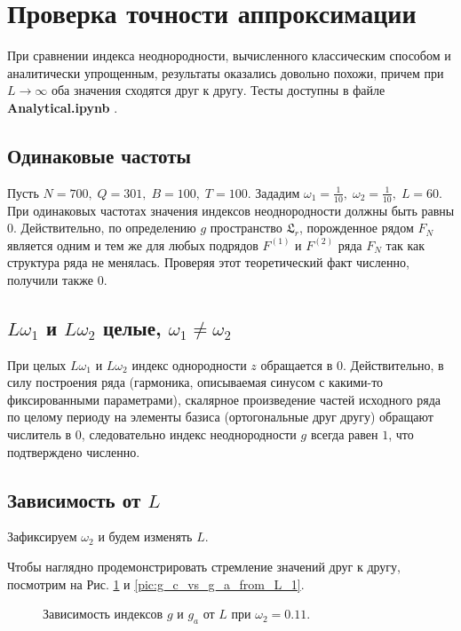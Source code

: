 \documentclass[specialist, substylefile = spbu.rtx,
			   subf, href, 12pt]{disser}
\begin{document}
\section{Проверка точности аппроксимации}
При сравнении индекса неоднородности, вычисленного классическим способом и аналитически упрощенным, результаты оказались довольно похожи, причем при $L \rightarrow \infty $ оба значения сходятся друг к другу. Тесты доступны в файле \textbf{Analytical.ipynb} \cite{Kononykhin2022}.



\subsection{Одинаковые частоты}
Пусть $ N = 700,\; Q = 301,\; B = 100,\; T = 100 $. 
Зададим $\omega_1 = \frac{1}{10},\; \omega_2 = \frac{1}{10},\; L = 60$. При одинаковых частотах значения индексов неоднородности должны быть равны $ 0 $. Действительно, по определению $ g $ пространство $ \mathfrak{L}_r $, порожденное рядом $ F_N $ является одним и тем же для любых подрядов $ F^{(1)} $ и $ F^{(2)} $ ряда $ F_N $ так как структура ряда не менялась.
Проверяя этот теоретический факт численно, получили также $ 0 $.

\subsection{$L\omega_1$ и $L\omega_2 $ целые, $\omega_1 \neq \omega_2 $}
При целых $L\omega_1$ и $L\omega_2 $ индекс однородности $ z $ обращается в 0. Действительно, в силу построения ряда (гармоника, описываемая синусом с какими-то фиксированными параметрами), скалярное произведение частей исходного ряда по целому периоду на элементы базиса (ортогональные друг другу) обращают числитель в 0, следовательно индекс неоднородности $ g $ всегда равен $ 1 $, что подтверждено численно.


\subsection{Зависимость от $ L $}

Зафиксируем $ \omega_2 $ и будем изменять $ L $. 

Чтобы наглядно продемонстрировать стремление значений друг к другу, посмотрим на Рис. \ref{pic:g_c_vs_g_a_from_L} и \ref{pic:g_c_vs_g_a_from_L_1}.

\begin{figure}[!hhh]
	\caption{Зависимость индексов $ g $ и $ g_a $ от $ L $ при $ \omega_2 = 0.11 $.}
	\label{pic:g_c_vs_g_a_from_L}
\end{figure}
\end{document}
